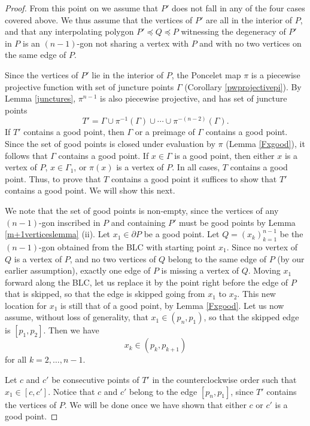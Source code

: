 \documentclass[11pt]{amsart}
\theoremstyle{remark}
\numberwithin{equation}{section}
\renewcommand{\precsim}{\preccurlyeq}
\begin{document}
\begin{proof}
From this point on we assume that $P'$ does not fall in any of the four cases covered above. We thus assume that the vertices of $P'$ are all in the interior of $P$, and that any interpolating polygon $P'\precsim Q\precsim P$ witnessing the degeneracy of $P'$ in $P$ is an $(n-1)$-gon not sharing  a vertex with $P$ and with no two vertices on the same edge of $P$. 

  


Since the vertices of $P'$ lie in the interior of $P$, the Poncelet map $\pi$ is a piecewise projective function with  set of juncture points   $\Gamma$ (Corollary \ref{pwprojectivepi}). By Lemma \ref{junctures}, $\pi^{n-1}$ is also piecewise projective, and has set of juncture points 
\[
T' = \Gamma \cup \pi^{-1}(\Gamma) \cup \cdots \cup \pi^{-(n-2)}(\Gamma).
\]
If $T'$ contains a good point,  then $\Gamma$ or a preimage of $\Gamma$ contains a good point. Since the set of good points is closed under evaluation by $\pi$ (Lemma \ref{Fxgood}),  it follows that $\Gamma$ contains a good point. If $x\in \Gamma$ is a good point, then  either $x$ is a vertex of $P$, $x\in \Gamma_1$, or $\pi(x)$ 
is a vertex of $P$. In all cases, $T$ contains a good point. Thus, to prove that $T$ contains a good point it suffices to show that $T'$ contains a good point. We will show this next.



 

We note that the set of good points is non-empty, since the vertices of  any $(n-1)$-gon inscribed in $P$ and containing $P'$ must be good points by Lemma \ref{m+1verticeslemma} (ii). Let $x_1\in \partial P$ be a good point. Let  $Q=(x_k)_{k=1}^{n-1}$ be the $(n-1)$-gon obtained from the BLC with starting point $x_1$. 
Since no vertex of $Q$ is a vertex of $P$, and no two vertices of $Q$ belong to the same edge of $P$ (by our earlier assumption), exactly  one edge of $P$ is missing a vertex of $Q$. Moving $x_1$ forward along the BLC, let us replace it by the point right before the edge of $P$ that is skipped, so that the edge is skipped going from $x_1$ to $x_2$. This new location for $x_1$ is still that of a good point, by Lemma \ref{Fxgood}. Let us now assume, without loss of generality, that $x_1\in (p_n,p_1)$, so that the skipped edge is $[p_1,p_2]$. Then we have 
\[
x_k\in (p_k,p_{k+1})
\] 
for  all $k=2, \ldots,n-1$.


Let $c$ and $c'$ be consecutive points of $T'$ in the counterclockwise order such that $x_1\in [c,c']$. Notice that $c$ and $c'$ belong to the edge $[p_n,p_1]$, since $T'$ contains the vertices of $P$. We will be done once we have shown that either $c$ or $c'$ is a good point. 



\end{proof}
\end{document}
